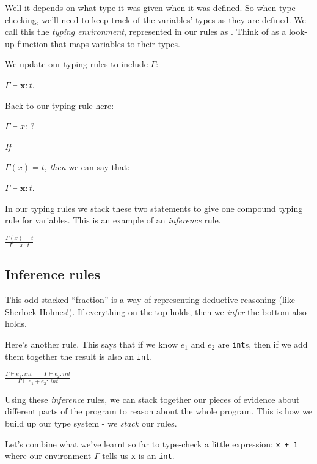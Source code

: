 Well it depends on what type it was given when it was defined. So when
type-checking, we'll need to keep track of the variables' types as they
are defined. We call this the \emph{typing environment}, represented in
our rules as {{}} . Think of
{{}} as a look-up function that maps variables to
their types.

We update our typing rules to include {{{\(\Gamma\)}}}:

{{{\(\Gamma \vdash \mathbf{x}:t\)}}}.

Back to our typing rule here:

{{{\(\Gamma \vdash x:\ ?\)}}}

\emph{If} {{{\(\Gamma(x) = t\)}},
\emph{then} we can say that:

{{{\(\Gamma \vdash \mathbf{x}:t\)}}}.

In our typing rules we stack these two statements to give one compound
typing rule for variables. This is an example of an \emph{inference}
rule.

{{{\(\frac{\Gamma(x) = t}{\Gamma \vdash x:\ t}\)}}}

\hypertarget{inference-rules}{%
\subsection{\texorpdfstring{\protect\hyperlink{inference-rules}{}Inference
rules}{Inference rules}}\label{inference-rules}}

This odd stacked ``fraction'' is a way of representing deductive
reasoning (like Sherlock Holmes!). If everything on the top holds, then
we \emph{infer} the bottom also holds.

Here's another rule. This says that if we know
{{{\(e_{1}\)}}} and
{{{\(e_{2}\)}}} are
\texttt{int}s, then if we add them together the result is also an
\texttt{int}.

{{\(\frac{\Gamma \vdash e_{1}:int\text{~~~~~~}\Gamma \vdash e_{2}:int}{\Gamma \vdash e_{1} + e_{2}:\ int}\)}}

Using these \emph{inference} rules, we can stack together our pieces of
evidence about different parts of the program to reason about the whole
program. This is how we build up our type system - we \emph{stack} our
rules.

Let's combine what we've learnt so far to type-check a little
expression: \texttt{x\ +\ 1} where our environment
{{{\(\Gamma\)}}} tells us \texttt{x} is an \texttt{int}.

}
